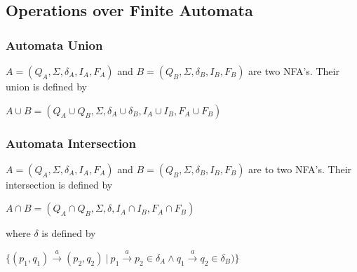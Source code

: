   \subsection{Operations over Finite Automata}
    \subsubsection{Automata Union}
    \label{defAUnion}
    \begin{definition}
      $A=(Q_A,\Sigma,\delta_A,I_A,F_A)$ and $B=(Q_B,\Sigma,\delta_B,I_B,F_B)$ are two NFA's. Their union is defined by
      \begin{description}
        \item $A \cup B=(Q_A\cup Q_B,\Sigma,\delta_A\cup\delta_B,I_A\cup I_B,F_A\cup F_B)$
      \end{description}
    \end{definition}
    
    \subsubsection{Automata Intersection}
    \label{defAInter}
    \begin{definition}
      $A=(Q_A,\Sigma,\delta_A,I_A,F_A)$ and $B=(Q_B,\Sigma,\delta_B,I_B,F_B)$ are to two NFA's. Their intersection is defined by
      \begin{description}
        \item $A \cap B=(Q_A\cap Q_B,\Sigma,\delta,I_A\cap I_B,F_A\cap F_B)$\
      \end{description}
      where $\delta$ is defined by
      \begin{description}
        \item $\{(p_1,q_1) \xrightarrow{a} (p_2,q_2)\ |\ p_1 \xrightarrow{a} p_2 \in \delta_A \wedge q_1 \xrightarrow{a} q_2 \in \delta_B)\}$\
      \end{description}
    \end{definition}

